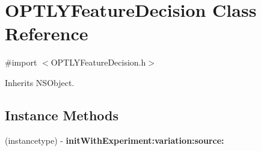 \hypertarget{interface_o_p_t_l_y_feature_decision}{}\section{O\+P\+T\+L\+Y\+Feature\+Decision Class Reference}
\label{interface_o_p_t_l_y_feature_decision}


{\ttfamily \#import $<$O\+P\+T\+L\+Y\+Feature\+Decision.\+h$>$}



Inherits N\+S\+Object.

\subsection*{Instance Methods}
\begin{DoxyCompactItemize}
\item 
\mbox{\label{interface_o_p_t_l_y_feature_decision_a77941cc5dce510bd0d400b90a4ba1c15}} 
(instancetype) -\/ {\bfseries init\+With\+Experiment\+:variation\+:source\+:}
\end{DoxyCompactItemize}
